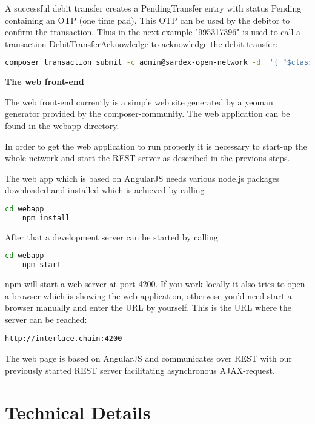 A successful debit transfer creates a PendingTransfer entry with status Pending containing an OTP (one time pad). This OTP can be used by the debitor to confirm the transaction. Thus in the next example "995317396" is used to call a transaction DebitTransferAcknowledge to acknowledge the debit transfer:

\begin{lstlisting}[language=bash]
	composer transaction submit -c admin@sardex-open-network -d  '{ "$class": "net.sardex.interlace.DebitTransferAcknowledge", "transfer": "resource:net.sardex.interlace.PendingTransfer#995317396" }'
\end{lstlisting}

\textbf{The web front-end}

The web front-end currently is a simple web site generated by a yeoman generator provided by the composer-community. The web application can be found in the webapp directory.

In order to get the web application to run properly it is necessary to start-up the whole network and start the REST-server as described in the previous steps.

The web app which is based on AngularJS needs various node.js packages downloaded and installed which is achieved by calling

\begin{lstlisting}[language=bash]
	cd webapp
	npm install
\end{lstlisting}

After that a development server can be started by calling

\begin{lstlisting}[language=bash]
	cd webapp
	npm start
\end{lstlisting}

npm will start a web server at port 4200. If you work locally it also tries to open a browser which is showing the web application, otherwise you'd need start a browser manually and enter the URL by yourself. This is the URL where the server can be reached:

\begin{lstlisting}
http://interlace.chain:4200
\end{lstlisting}

The web page is based on AngularJS and communicates over REST with our previously started REST server facilitating asynchronous AJAX-request.

\section{Technical Details}

